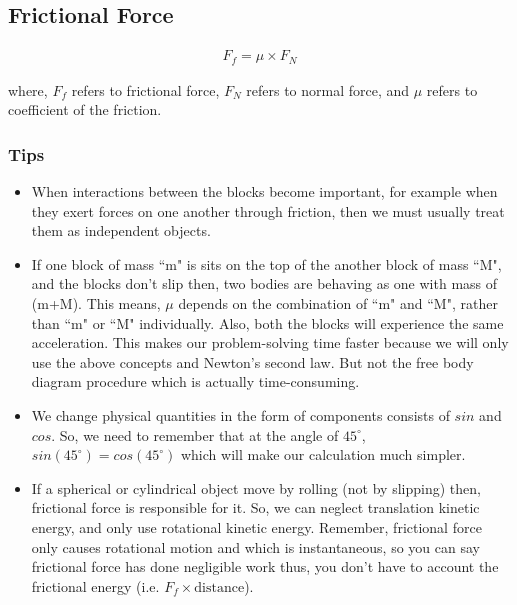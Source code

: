 \subsection{Frictional Force}

\begin{align}
F_{f} = \mu \times F_{N}
\end{align}

where, $F_{f}$ refers to frictional force, $F_{N}$ refers to normal force, and $\mu$ refers to coefficient of the friction.

\subsubsection*{Tips}

\begin{itemize}
\item When interactions between the blocks become important, for example when they exert forces on one another through friction, then we must usually treat them as independent objects.

\item If one block of mass ``m" is sits on the top of the another block of mass ``M", and the blocks don't slip then, two bodies are behaving as one with mass of (m+M).  This means, $\mu$ depends on the combination of ``m" and ``M", rather than ``m" or ``M" individually. Also, both the blocks will experience the same acceleration. This makes our problem-solving time faster because we will only use the above concepts and Newton's second law. But not the free body diagram procedure which is actually time-consuming.

\item We change physical quantities in the form of components consists of $sin$ and $cos$. So, we need to remember that at the angle of $45^{\circ}$, $sin(45^{\circ}) = cos(45^{\circ})$ which will make our calculation much simpler.

\item If a spherical or cylindrical object move by rolling (not by slipping) then, frictional force is responsible for it. So, we can neglect translation kinetic energy, and only use rotational kinetic energy. Remember, frictional force only causes rotational motion and which is instantaneous, so you can say frictional force has done negligible work thus, you don't have to account the frictional energy (i.e. $F_{f} \times \text{distance}$).


\end{itemize}

